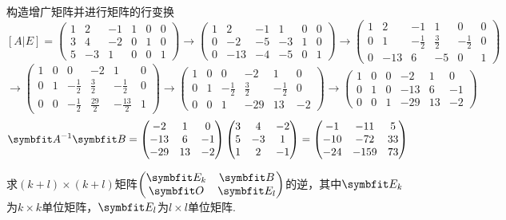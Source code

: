 \begin{solution}
构造增广矩阵并进行矩阵的行变换
\[[A|E]=\left(\begin{array}{ccc|ccc}1&2&-1&1&0&0\\3&4&-2&0&1&0\\5&-3&1&0&0&1\end{array}\right)\rightarrow \left(\begin{array}{ccc|ccc}1&2&-1&1&0&0\\0&-2&-5&-3&1&0\\0&-13&-4&-5&0&1\end{array}\right)\rightarrow \left(\begin{array}{ccc|ccc}1&2&-1&1&0&0\\0&1&-\frac{1}{2}&\frac{3}{2}&-\frac{1}{2}&0\\0&-13&6&-5&0&1\end{array}\right)\]
\[\rightarrow \left(\begin{array}{ccc|ccc}1&0&0&-2&1&0\\0&1&-\frac{1}{2}&\frac{3}{2}&-\frac{1}{2}&0\\0&0&-\frac{1}{2}&\frac{29}{2}&-\frac{13}{2}&1\end{array}\right)
\rightarrow \left(\begin{array}{ccc|ccc}1&0&0&-2&1&0\\0&1&-\frac{1}{2}&\frac{3}{2}&-\frac{1}{2}&0\\0&0&1&-29&13&-2\end{array}\right)\rightarrow 
\left(\begin{array}{ccc|ccc}1&0&0&-2&1&0\\0&1&0&-13&6&-1\\0&0&1&-29&13&-2\end{array}\right)\]
\[\bv{A}^{-1}\bv{B}=\begin{pmatrix}-2&1&0\\-13&6&-1\\-29&13&-2\end{pmatrix}\begin{pmatrix}3&4&-2\\5&-3&1\\1&2&-1\end{pmatrix}=\begin{pmatrix}-1&-11&5\\-10&-72&33\\-24&-159&73\end{pmatrix}\]
\end{solution}
\begin{example}{}{}
    求$(k+l)\times(k+l)$矩阵$\begin{pmatrix}\bv{E}_k&\bv{B}\\\bv{O}&\bv{E}_l\end{pmatrix}$的逆，其中$\bv{E}_k$为$k\times k$单位矩阵，$\bv{E}_l$为$l\times l$单位矩阵.
\end{example}
